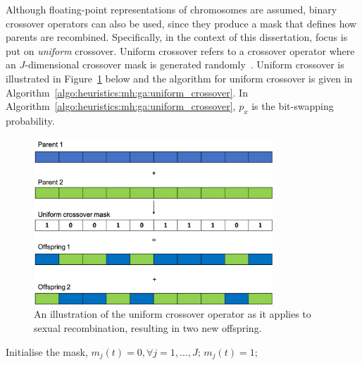 {Although floating-point representations of chromosomes are assumed, binary crossover operators can also be used, since they produce a mask that defines how parents are recombined. Specifically, in the context of this dissertation, focus is put on \textit{uniform} crossover. Uniform crossover refers to a crossover operator where an $J$-dimensional crossover mask is generated randomly~\cite{ref:syswerda:1989}. Uniform crossover is illustrated in Figure~\ref{fig:heuristics:mh:ga:uniform_crossover} below and the algorithm for uniform crossover is given in Algorithm~\ref{algo:heuristics:mh:ga:uniform_crossover}. In Algorithm~\ref{algo:heuristics:mh:ga:uniform_crossover}, $p_{x}$ is the bit-swapping probability.


\begin{figure}[htbp]
	\centering
	\includegraphics[width=0.8\textwidth]{images/uniform_crossover.pdf}
	\caption{An illustration of the uniform crossover operator as it applies to sexual recombination, resulting in two new offspring.}
	\label{fig:heuristics:mh:ga:uniform_crossover}
\end{figure}


\begin{algorithm}[htb]
	\caption{The pseudo-code for the uniform crossover operator as used by \acp{GA}.}
	\label{algo:heuristics:mh:ga:uniform_crossover}
	\begin{algorithmic}
		\State Initialise the mask, $m_{j}(t) = 0, \forall j = 1, \dots, J$;
		\State $m_{j}(t) = 1$;
		\EndIf
		\EndFor
		\State
	\end{algorithmic}
\end{algorithm}


}
